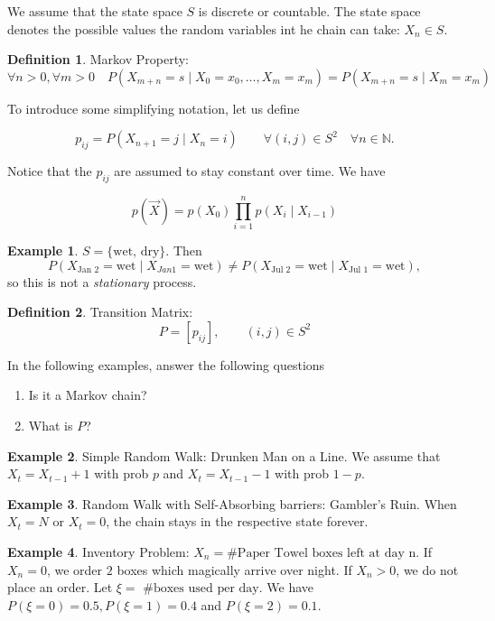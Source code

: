 \documentclass{article}
\theoremstyle{definition}
\newtheorem{exmp}{Example}[section]
\newtheorem{defn}{Definition}[section]
\begin{document}
We assume that the state space $S$ is discrete or countable. The state space denotes the possible values the random variables int he chain can take: $X_n \in S$.

\begin{defn}{Markov Property:} 
$$
\forall n > 0, \forall m > 0 \quad P\left( X_{m+n} = s \mid X_0 = x_0 , \ldots, X_m = x_m \right) = P \left( X_{m+n} = s \mid X_m = x_m \right) 
$$
\end{defn}

To introduce some simplifying notation, let us define

$$
p_{ij} = P(X_{n+1} = j \mid X_n = i) \qquad \forall (i,j) \in S^2 \quad \forall n \in \mathbb{N}.
$$

Notice that the $p_{ij}$ are assumed to stay constant over time. We have 

$$
p( \vec X ) = p(X_0) \prod_{i=1}^n p(X_i \mid X_{i-1})
$$

\begin{exmp}
$S = \{ \text{wet, dry} \}$. Then 
$$
P \left(X_{\text{Jan 2}} = \text{wet} \mid X_{Jan 1} = \text{wet} \right) \ne P \left(X_{\text{Jul 2}} = \text{wet} \mid X_{\text{Jul 1}} = \text{wet} \right),
$$
so this is not a \emph{stationary} process.
\end{exmp}

\begin{defn}
Transition Matrix:
$$
P = \left[ p_{ij} \right], \qquad (i,j) \in S^2
$$
\end{defn}

In the following examples, answer the following questions 

\begin{enumerate}
\item Is it a Markov chain?
\item What is $P$?
\end{enumerate}

\begin{exmp} Simple Random Walk: Drunken Man on a Line. We assume that $X_t = X_{t-1} + 1$ with prob $p$ and $X_t = X_{t-1} - 1$ with prob $1-p$.
\end{exmp}

\begin{exmp} Random Walk with Self-Absorbing barriers: Gambler's Ruin. When $X_t = N$ or $X_t = 0$, the chain stays in the respective state forever. 
\end{exmp}

\begin{exmp} Inventory Problem:
$X_n = \text{\# Paper Towel boxes left at day n}$.
If $X_n = 0$, we order $2$ boxes which magically arrive over night. If $X_n > 0$, we do not place an order. Let $\xi = \text{ \# boxes used per day}$. We have $P(\xi = 0) = 0.5, P(\xi = 1) =0.4$ and $P(\xi = 2) = 0.1$.
\end{exmp}
\end{document}
